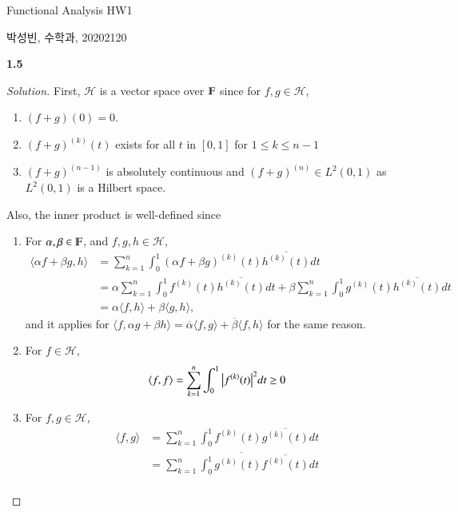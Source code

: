 \documentclass[a4paper, 12pt]{article}
\theoremstyle{Mydefinition}
\theoremstyle{Mytheorem}
\begin{document}
\thispagestyle{myfirstpage}
\begin{center}
	\Large{Functional Analysis HW1}
\end{center}
박성빈, 수학과, 20202120

\noindent \textbf{1.5}

\begin{proof}[Solution]
First, $\mathscr{H}$ is a vector space over $\varmathbb{F}$ since for $f,g\in \mathscr{H}$,
\begin{enumerate}
    \item $(f+g)(0) = 0$.
    \item $(f+g)^{(k)}(t)$ exists for all $t$ in $[0,1]$ for $1\leq k \leq n-1$
    \item $(f+g)^{(n-1)}$ is absolutely continuous and $(f+g)^{(n)}\in L^2(0,1)$ as $L^2(0,1)$ is a Hilbert space.
\end{enumerate}
Also, the inner product is well-defined since 
\begin{enumerate}
    \item For $\alpha,\beta\in \varmathbb{F}$, and $f,g,h\in \mathscr{H}$,
    \begin{equation}
    \begin{split}
        \langle \alpha f + \beta g, h\rangle &= \sum\limits_{k=1}^n \int_0^1 (\alpha f + \beta g)^{(k)}(t)\overline{h^{(k)}(t)}dt \\
        &= \alpha\sum\limits_{k=1}^n \int_0^1 f^{(k)}(t)\overline{h^{(k)}(t)}dt + \beta\sum\limits_{k=1}^n \int_0^1 g^{(k)}(t)\overline{h^{(k)}(t)}dt \\
        &=\alpha \langle f, h\rangle + \beta\langle g,h\rangle,
        \end{split}
    \end{equation}
    and it applies for $\langle f, \alpha g+\beta h\rangle = \overline{\alpha}\langle f,  g\rangle+\overline{\beta}\langle f, h\rangle$ for the same reason.
    \item For $f\in \mathscr{H}$, 
    \begin{equation}
        \langle f,f\rangle = \sum\limits_{k=1}^n \int_0^1 \abs{f^{(k)}(t)}^2dt\geq 0
    \end{equation}
    \item For $f, g\in \mathscr{H}$, \begin{equation}
    \begin{split}
        \langle f,g\rangle &= \sum\limits_{k=1}^n \int_0^1 f^{(k)}(t)\overline{g^{(k)}(t)}dt \\
        &= \overline{\sum\limits_{k=1}^n\int_0^1 g^{(k)}(t)\overline{f^{(k)}(t)}dt} \\

\end{split}
\end{equation}
\end{enumerate}
\end{proof}
\end{document}
